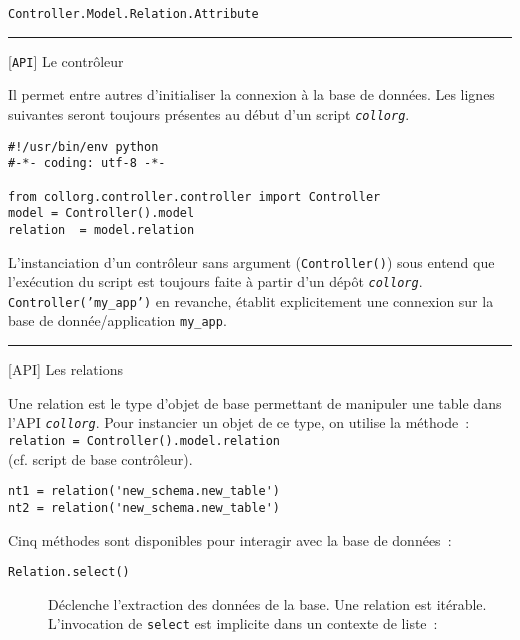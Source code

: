 \documentclass[a4paper]{letter}
\newcommand{\subsection}[2]{
\rule{0.5cm}{0.1pt} {\scriptsize [{#1}]} {#2}
}
\newcommand{\collorg}{\texttt{\textit{collorg}}}
\newcommand{\API}{\texttt{API}}
\begin{document}
\begin{multicols}{3}
\texttt{Controller.Model.Relation.Attribute}

\subsection{\API}{Le contrôleur}

Il permet entre autres d'initialiser la connexion à la base de données. Les lignes suivantes seront toujours présentes au début d'un script \collorg.

\begin{scriptsize}
\begin{verbatim}
#!/usr/bin/env python
#-*- coding: utf-8 -*-

from collorg.controller.controller import Controller
model = Controller().model
relation  = model.relation
\end{verbatim}
\end{scriptsize}

L'instanciation d'un contrôleur sans argument (\texttt{Controller()}) sous entend que l'exécution du script est toujours faite à partir d'un dépôt \collorg. \texttt{Controller('my\_app')} en revanche, établit explicitement une connexion sur la base de donnée/application \texttt{my\_app}.


\subsection{API}{Les relations}

Une relation est le type d'objet de base permettant de manipuler une table dans l'API \collorg. Pour instancier un objet de ce type, on utilise la méthode~:\\ \texttt{relation = Controller().model.relation}\\ (cf. script de base contrôleur).

\begin{scriptsize}
\begin{verbatim}
nt1 = relation('new_schema.new_table')
nt2 = relation('new_schema.new_table')
\end{verbatim}
\end{scriptsize}

Cinq méthodes sont disponibles pour interagir avec la base de données~:

\begin{description}
\item[\texttt{Relation.select()}] Déclenche l'extraction des données de la base. Une relation est itérable. L'invocation de \texttt{select} est implicite dans un contexte de liste~:


\end{description}
\end{multicols}
\end{document}
